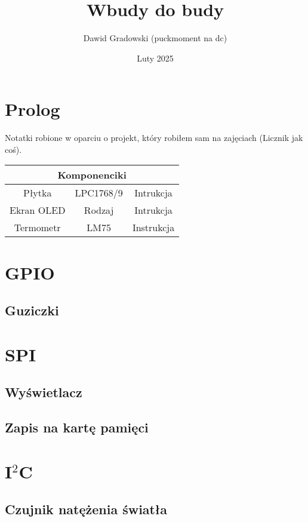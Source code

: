 \documentclass[11pt]{article}
\title{Wbudy do budy}
\author{Dawid Gradowski (puckmoment na dc)}
\date{Luty 2025}
\begin{document}
\maketitle
\renewcommand\contentsname{Spis treści}
\tableofcontents
\newpage
\section{Prolog}
Notatki robione w oparciu o projekt, który robiłem sam na zajęciach (Licznik jak coś).

\begin{center}
    \begin{tabular}{ |c|c|c| }
        \hline
        \multicolumn{3}{|c|}{Komponenciki}\\
        \hline
        Płytka & LPC1768/9 & Intrukcja \\ 
        \hline
        Ekran OLED & Rodzaj & Intrukcja \\
        \hline
        Termometr & LM75 & Instrukcja \\
        \hline  
    \end{tabular}
\end{center}
\section{GPIO}
\subsection{Guziczki}

\section{SPI}
\subsection{Wyświetlacz}
\subsection{Zapis na kartę pamięci}

\section{I$^2$C}
\subsection{Czujnik natężenia światła}
\end{document}
